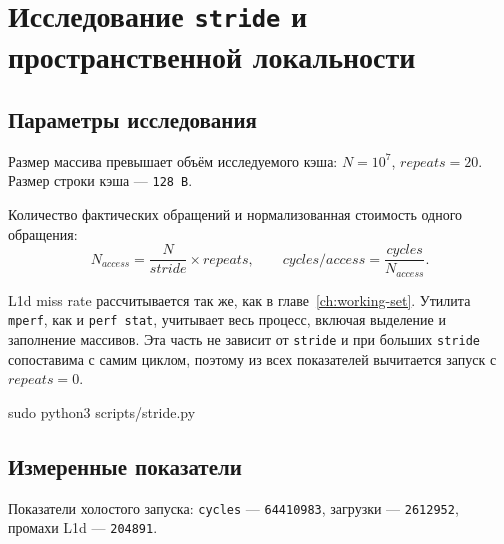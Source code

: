 \chapter{Исследование \texttt{stride} и пространственной локальности}
\label{ch:stride}

\section{Параметры исследования}

Размер массива превышает объём исследуемого кэша: $N = 10^7$, $\mathit{repeats} = 20$.
Размер строки кэша --- \texttt{128 B}.

Количество фактических обращений и нормализованная стоимость одного обращения:
$$
N_{access} = \frac{N}{\mathit{stride}} \times \mathit{repeats}, \qquad
\mathit{cycles/access} = \frac{\mathit{cycles}}{N_{access}}.
$$

L1d miss rate рассчитывается так же, как в главе~\ref{ch:working-set}.
Утилита \texttt{mperf}, как и \texttt{perf stat}, учитывает весь процесс, включая выделение и заполнение массивов.
Эта часть не зависит от \texttt{stride} и при больших \texttt{stride} сопоставима с самим циклом, поэтому из всех показателей вычитается запуск с $\mathit{repeats} = 0$.

\begin{commands}
sudo python3 scripts/stride.py
\end{commands}


\section{Измеренные показатели}

Показатели холостого запуска: \texttt{cycles} --- \texttt{64410983}, загрузки --- \texttt{2612952}, промахи L1d --- \texttt{204891}.

